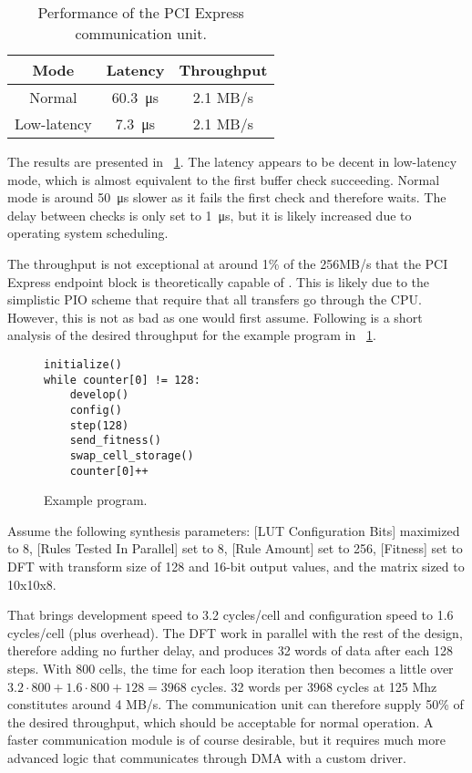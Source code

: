 \begin{table}[!ht]
    \renewcommand{\arraystretch}{1.4}
    \centering
    \begin{tabular}{c|c|c}
        \bfseries Mode & \bfseries Latency & \bfseries Throughput \\
        \hline
        Normal & \SI{60.3}{\micro\second} & 2.1 MB/s \\
        Low-latency & \SI{7.3}{\micro\second} & 2.1 MB/s \\
    \end{tabular}
    \caption[Communication performance]{
        Performance of the PCI Express communication unit.
    }
    \label{tab:communication-performance}
\end{table}

The results are presented in \tablename~\ref{tab:communication-performance}.
The latency appears to be decent in low-latency mode, which is almost equivalent to the first buffer check succeeding.
Normal mode is around \SI{50}{\micro\second} slower as it fails the first check and therefore waits.
The delay between checks is only set to \SI{1}{\micro\second}, but it is likely increased due to operating system scheduling.

The throughput is not exceptional at around 1\% of the 256MB/s that the PCI Express endpoint block is theoretically capable of \cite{ug672}.
This is likely due to the simplistic PIO scheme that require that all transfers go through the CPU.
However, this is not as bad as one would first assume.
Following is a short analysis of the desired throughput for the example program in \figurename~\ref{fig:example-program}.

\begin{figure}[!ht]
\begin{lstlisting}[xleftmargin=0.35\textwidth]
initialize()
while counter[0] != 128:
    develop()
    config()
    step(128)
    send_fitness()
    swap_cell_storage()
    counter[0]++
\end{lstlisting}
\caption[Example program] {
    Example program.
}
\label{fig:example-program}
\end{figure}

Assume the following synthesis parameters:
[LUT Configuration Bits] maximized to 8,
[Rules Tested In Parallel] set to 8,
[Rule Amount] set to 256,
[Fitness] set to DFT with transform size of 128 and 16-bit output values,
and the matrix sized to 10x10x8.

That brings development speed to 3.2 cycles/cell and configuration speed to 1.6 cycles/cell (plus overhead)\footnotemark.
The DFT work in parallel with the rest of the design, therefore adding no further delay, and produces 32 words of data after each 128 steps.
With 800 cells, the time for each loop iteration then becomes a little over $3.2 \cdot 800 + 1.6 \cdot 800 + 128 = 3968$ cycles.
32 words per 3968 cycles at 125 Mhz constitutes around 4 MB/s.
The communication unit can therefore supply 50\% of the desired throughput, which should be acceptable for normal operation.
A faster communication module is of course desirable, but it requires much more advanced logic that communicates through DMA with a custom driver.

